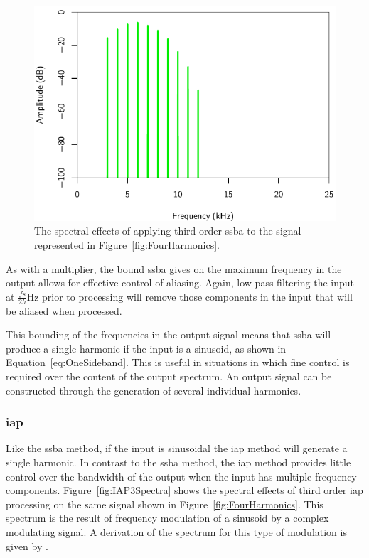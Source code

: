 			\begin{figure}[h!]
				\centering
				\includegraphics{chapter5/Images/SSBA3Spectra.pdf}
				\caption{The spectral effects of applying third order \acrshort{ssba} to the signal
					represented in Figure~\ref{fig:FourHarmonics}.}
				\label{fig:SSBA3Spectra}
			\end{figure}

			As with a multiplier, the bound \acrshort{ssba} gives on the maximum frequency in the output allows
			for effective control of aliasing. Again, low pass filtering the input at $\frac{fs}{2h}$Hz prior
			to processing will remove those components in the input that will be aliased when processed.

			This bounding of the frequencies in the output signal means that \acrshort{ssba} will produce a
			single harmonic if the input is a sinusoid, as shown in Equation~\ref{eq:OneSideband}. This is
			useful in situations in which fine control is required over the content of the output spectrum. An
			output signal can be constructed through the generation of several individual harmonics.

		\subsubsection*{\acrshort{iap}}
			Like the \acrshort{ssba} method, if the input is sinusoidal the \acrshort{iap} method will generate
			a single harmonic. In contrast to the \acrshort{ssba} method, the \acrshort{iap} method provides
			little control over the bandwidth of the output when the input has multiple frequency components.
			Figure~\ref{fig:IAP3Spectra} shows the spectral effects of third order \acrshort{iap} processing on
			the same signal shown in Figure~\ref{fig:FourHarmonics}. This spectrum is the result of frequency
			modulation of a sinusoid by a complex modulating signal. A derivation of the spectrum for this
			type of modulation is given by \citet{lebrun1977a}.

